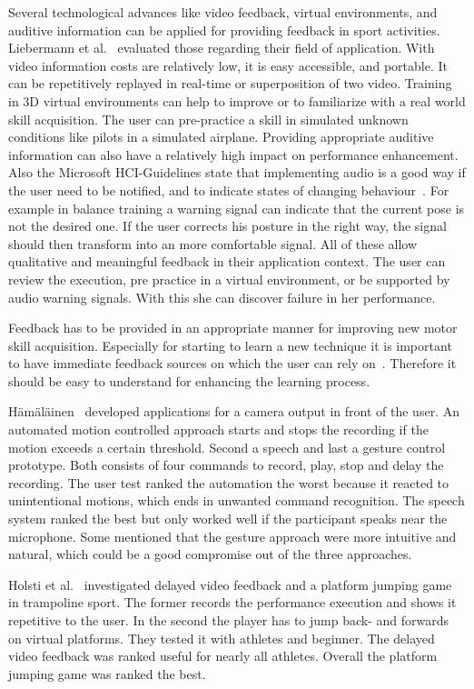Several technological advances like video feedback, virtual environments, and auditive information can be applied for providing feedback in sport activities. Liebermann et al.~\cite{Liebermann2002-zr} evaluated those regarding their field of application. With video information costs are relatively low, it is easy accessible, and portable. It can be repetitively replayed in real-time or superposition of two video. Training in 3D virtual environments can help to improve or to familiarize with a real world skill acquisition. The user can pre-practice a skill in simulated unknown conditions like pilots in a simulated airplane. Providing appropriate auditive information can also have a relatively high impact on performance enhancement. Also the Microsoft HCI-Guidelines state that implementing audio is a good way if the user need to be notified, and to indicate states of changing behaviour~\cite{MicrosoftHIG2014-mh}. For example in balance training a warning signal can indicate that the current pose is not the desired one. If the user corrects his posture in the right way, the signal should then transform into an more comfortable signal. All of these allow qualitative and meaningful feedback in their application context. The user can review the execution, pre practice in a virtual environment, or be supported by audio warning signals. With this she can discover failure in her performance.

Feedback has to be provided in an appropriate manner for improving new motor skill acquisition. Especially for starting to learn a new technique it is important to have immediate feedback sources on which the user can rely on~\cite{Hodges2002-gb, Winstein1990-to}. Therefore it should be easy to understand for enhancing the learning process. 

Hämäläinen~\cite{Hmlinen2004-ai} developed applications for a camera output in front of the user. An automated motion controlled approach starts and stops the recording if the motion exceeds a certain threshold. Second a speech and last a gesture control prototype. Both consists of four commands to record, play, stop and delay the recording. The user test ranked the automation the worst because it reacted to unintentional motions, which ends in unwanted command recognition. The speech system ranked the best but only worked well if the participant speaks near the microphone. Some mentioned that the gesture approach were more intuitive and natural, which could be a good compromise out of the three approaches.

Holsti et al.~\cite{Holsti2013-kn} investigated delayed video feedback and a platform jumping game in trampoline sport. The former records the performance execution and shows it repetitive to the user. In the second the player has to jump back- and forwards on virtual platforms. They tested it with athletes and beginner. The delayed video feedback was ranked useful for nearly all athletes. Overall the platform jumping game was ranked the best.

